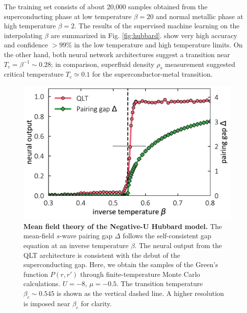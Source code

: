 \documentclass[amsmath,amssymb, aps, prl, twocolumn]{revtex4-1}
\begin{document}
The training set consists of about 20,000 samples obtained from the superconducting phase at low temperature $\beta=20$ and normal metallic phase at high temperature $\beta=2$. %
The results of the supervised machine learning on the interpolating $\beta$ are summarized in Fig. \ref{fig:hubbard}. %
show very high accuracy and confidence $>99\%$ in the low temperature and high temperature limits. On the other hand, both neural network architectures suggest a transition near $T_c =\beta^{-1} \sim 0.28$; in comparison, superfluid density $\rho_s$ measurement suggested critical temperature $T_c\simeq 0.1$ for the superconductor-metal transition\cite{Scalapino1993}. %
\begin{figure}
\includegraphics[scale=.43]{fig2.pdf}
\caption{{\bf Mean field theory of the Negative-U Hubbard model.} The mean-field $s$-wave pairing gap $\Delta$ follows the self-consistent gap equation at an inverse temperature $\beta$. The neural output from the QLT architecture is consistent with the debut of the superconducting gap. Here, we obtain the samples of the Green's function $P(r, r')$ through finite-temperature Monte Carlo calculations. $U=-8$, $\mu=-0.5$. The transition temperature $\beta_c\sim 0.545$ is shown as the vertical dashed line. A higher resolution is imposed near $\beta_c$ for clarity.}\label{fig:mlmft}
\end{figure}
\end{document}
